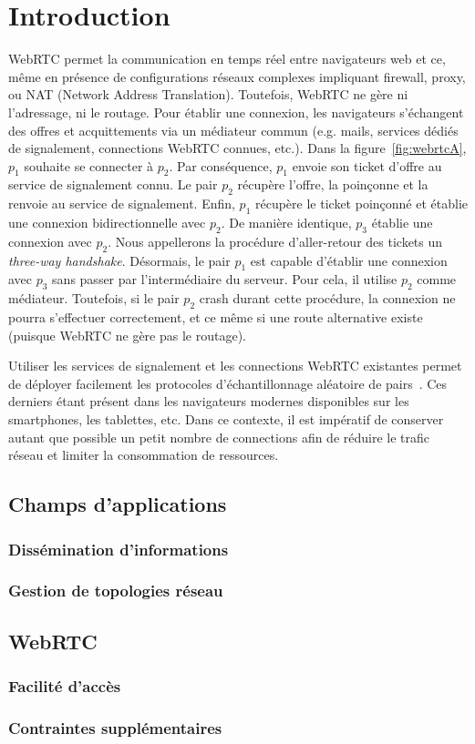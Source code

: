 
\section{Introduction}

WebRTC permet la communication en temps réel entre navigateurs web et ce, même
en présence de configurations réseaux complexes impliquant firewall, proxy, ou
NAT (Network Address Translation). Toutefois, WebRTC ne gère ni l'adressage, ni
le routage. Pour établir une connexion, les navigateurs s'échangent des offres
et acquittements via un médiateur commun (e.g. mails, services dédiés de
signalement, connections WebRTC connues, etc.). Dans la
figure~\ref{fig:webrtcA}, $p_1$ souhaite se connecter à $p_2$. Par conséquence,
$p_1$ envoie son ticket d'offre au service de signalement connu. Le pair $p_2$
récupère l'offre, la poinçonne et la renvoie au service de signalement. Enfin,
$p_1$ récupère le ticket poinçonné et établie une connexion bidirectionnelle
avec $p_2$. De manière identique, $p_3$ établie une connexion avec $p_2$. Nous
appellerons la procédure d'aller-retour des tickets un \emph{three-way
  handshake}. Désormais, le pair $p_1$ est capable d'établir une connexion avec
$p_3$ sans passer par l'intermédiaire du serveur. Pour cela, il utilise $p_2$
comme médiateur. Toutefois, si le pair $p_2$ crash durant cette procédure, la
connexion ne pourra s'effectuer correctement, et ce même si une route
alternative existe (puisque WebRTC ne gère pas le routage).

Utiliser les services de signalement et les connections WebRTC existantes permet
de déployer facilement les protocoles d'échantillonnage aléatoire de
pairs~\cite{jelasity2007gossip}. Ces derniers étant présent dans les navigateurs
modernes disponibles sur les smartphones, les tablettes, etc. Dans ce contexte,
il est impératif de conserver autant que possible un petit nombre de connections
afin de réduire le trafic réseau et limiter la consommation de ressources.

\subsection{Champs d'applications}

\subsubsection{Dissémination d'informations}
\subsubsection{Gestion de topologies réseau}

\subsection{WebRTC}

\subsubsection{Facilité d'accès}
\subsubsection{Contraintes supplémentaires}



